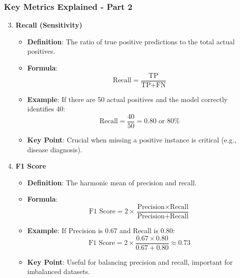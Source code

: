 \documentclass[aspectratio=169]{beamer}
\begin{document}
\begin{frame}[fragile]
    \frametitle{Key Metrics Explained - Part 2}
    \begin{enumerate}
        \setcounter{enumi}{2} %
        \item \textbf{Recall (Sensitivity)}
        \begin{itemize}
            \item \textbf{Definition}: The ratio of true positive predictions to the total actual positives.
            \item \textbf{Formula}:
            \begin{equation}
            \text{Recall} = \frac{\text{TP}}{\text{TP} + \text{FN}}
            \end{equation}
            \item \textbf{Example}: If there are 50 actual positives and the model correctly identifies 40:
            \begin{equation}
            \text{Recall} = \frac{40}{50} = 0.80 \text{ or } 80\%
            \end{equation}
            \item \textbf{Key Point}: Crucial when missing a positive instance is critical (e.g., disease diagnosis).
        \end{itemize}

        \item \textbf{F1 Score}
        \begin{itemize}
            \item \textbf{Definition}: The harmonic mean of precision and recall.
            \item \textbf{Formula}:
            \begin{equation}
            \text{F1 Score} = 2 \times \frac{\text{Precision} \times \text{Recall}}{\text{Precision} + \text{Recall}}
            \end{equation}
            \item \textbf{Example}: If Precision is 0.67 and Recall is 0.80:
            \begin{equation}
            \text{F1 Score} = 2 \times \frac{0.67 \times 0.80}{0.67 + 0.80} \approx 0.73
            \end{equation}
            \item \textbf{Key Point}: Useful for balancing precision and recall, important for imbalanced datasets.
        \end{itemize}
    \end{enumerate}
\end{frame}
\end{document}

